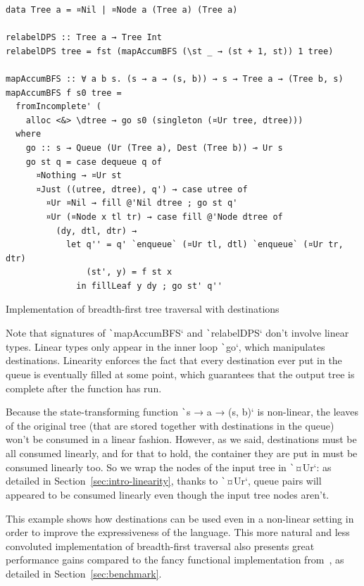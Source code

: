 \documentclass[english]{jflart}
\begin{document}
\begin{table}[t]
\small
\begin{verbatim}
data Tree a = ¤Nil | ¤Node a (Tree a) (Tree a)

relabelDPS :: Tree a → Tree Int
relabelDPS tree = fst (mapAccumBFS (\st _ → (st + 1, st)) 1 tree)

mapAccumBFS :: ∀ a b s. (s → a → (s, b)) → s → Tree a → (Tree b, s)
mapAccumBFS f s0 tree =
  fromIncomplete' (
    alloc <&> \dtree → go s0 (singleton (¤Ur tree, dtree)))
  where
    go :: s → Queue (Ur (Tree a), Dest (Tree b)) ⊸ Ur s
    go st q = case dequeue q of
      ¤Nothing → ¤Ur st
      ¤Just ((utree, dtree), q') → case utree of
        ¤Ur ¤Nil → fill @'Nil dtree ; go st q'
        ¤Ur (¤Node x tl tr) → case fill @'Node dtree of
          (dy, dtl, dtr) →
            let q'' = q' `enqueue` (¤Ur tl, dtl) `enqueue` (¤Ur tr, dtr)
                (st', y) = f st x
              in fillLeaf y dy ; go st' q''
\end{verbatim}
\caption{Implementation of breadth-first tree traversal with destinations}
\label{table:impl-bfs-tree-traversal}
\end{table}

Note that signatures of \texttt`mapAccumBFS` and \texttt`relabelDPS` don't involve linear types. Linear types only appear in the inner loop \texttt`go`, which manipulates destinations. Linearity enforces the fact that every destination ever put in the queue is eventually filled at some point, which guarantees that the output tree is complete after the function has run.

Because the state-transforming function \texttt`s → a → (s, b)` is non-linear, the leaves of the original tree (that are stored together with destinations in the queue) won't be consumed in a linear fashion. However, as we said, destinations must be all consumed linearly, and for that to hold, the container they are put in must be consumed linearly too. So we wrap the nodes of the input tree in \texttt`¤Ur`: as detailed in Section~\ref{sec:intro-linearity}, thanks to \texttt`¤Ur`, queue pairs will appeared to be consumed linearly even though the input tree nodes aren't.

This example shows how destinations can be used even in a non-linear setting in order to improve the expressiveness of the language. This more natural and less convoluted implementation of breadth-first traversal also presents great performance gains compared to the fancy functional implementation from~\cite{gibbons_phases_2023}, as detailed in Section~\ref{sec:benchmark}.
\end{document}
